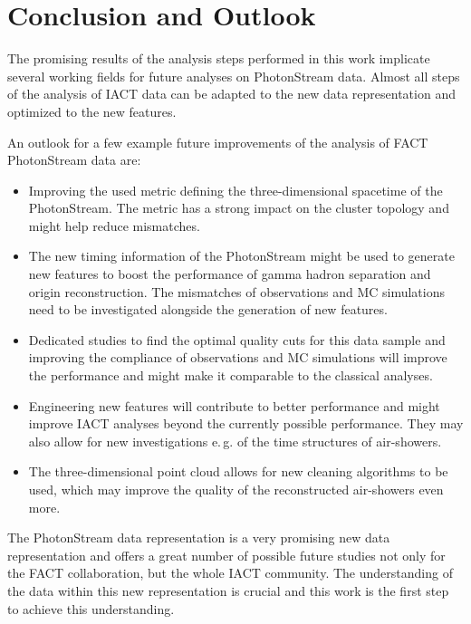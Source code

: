 \chapter{Conclusion and Outlook}
%
The promising results of the analysis steps performed in this work implicate
several working fields for future analyses on PhotonStream data. Almost
all steps of the analysis of IACT data can be adapted to the new data
representation and optimized to the new features.

An outlook for a few example future improvements of the analysis of FACT
PhotonStream data are:

\begin{itemize}
  \item Improving the used metric defining the three-dimensional spacetime of the PhotonStream. The metric has a strong impact on the cluster topology and might help reduce mismatches.
  \item The new timing information of the PhotonStream might be used to generate new features to boost the performance of gamma hadron separation and origin reconstruction. The mismatches of observations and MC simulations need to be investigated alongside the generation of new features.
  \item Dedicated studies to find the optimal quality cuts for this data sample and improving the compliance of observations and MC simulations will improve the performance and might make it comparable to the classical analyses.
  \item Engineering new features will contribute to better performance and might improve IACT analyses beyond the currently possible performance. They may also allow for new investigations e.\,g. of the time structures of air-showers.
  \item The three-dimensional point cloud allows for new cleaning algorithms to be used, which may improve the quality of the reconstructed air-showers even more.
\end{itemize}

The PhotonStream data representation is a very promising new data
representation and offers a great number of possible future studies not only for the FACT collaboration, but the whole IACT community. The
understanding of the data within this new representation is crucial and this
work is the first step to achieve this understanding.
